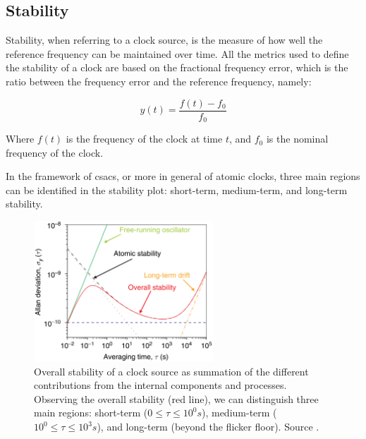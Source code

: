 \subsection{Stability}
\label{subsec:stability}

Stability, when referring to a clock source, is the measure of how well the reference frequency can be maintained over time.
All the metrics used to define the stability of a clock are based on the fractional frequency error, which is the ratio between the frequency error and the reference frequency, namely:

\begin{equation}
  y(t) = \frac{f(t) - f_0}{f_0}
  \label{eq:fractional_frequency_error}
\end{equation}

Where $f(t)$ is the frequency of the clock at time $t$, and $f_0$ is the nominal frequency of the clock.

In the framework of \acrshort{csacs}, or more in general of atomic clocks, three main regions can be identified in the stability plot: short-term, medium-term, and long-term stability.

\begin{figure}[H]
  \centering
  \includegraphics[width=0.6\textwidth, max width=\linewidth]{img/overall-statbility-contributions.png}
  \caption{
    Overall stability of a clock source as summation of the different contributions from the internal components and processes.
    Observing the overall stability (red line), we can distinguish three main regions: short-term ($0 \le \tau \le 10^{0}s$), medium-term ($10^0 \le \tau \le 10^{3}s$), and long-term (beyond the flicker floor).
    Source \cite{Knappe}.
  }
  \label{fig:overall-statbility-contributions}
\end{figure}

